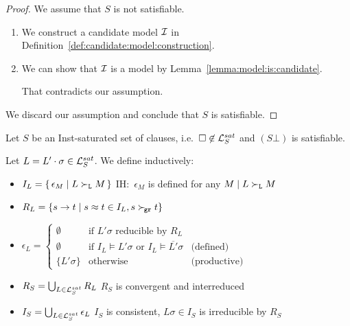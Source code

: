        \begin{proof} We assume that \( S \) is not satisfiable.
           \begin{enumerate}
               \item We construct a candidate model \( \mathcal{I} \) in Definition~\vref{def:candidate:model:construction}.
               \item We can show that \( \mathcal{I} \) is a model by Lemma~\vref{lemma:model:is:candidate}.

                That contradicts our assumption.
           \end{enumerate}
            We discard our assumption and conclude that \( S \) is satisfiable.
           \end{proof}

   \begin{definition}\label{def:candidate:model:construction}

        Let \( S \) be an Inst-saturated set of clauses,
        i.e.~\( \square\not\in\mathcal{L}_S^{sat} \) and \( (S\bot) \) is satisfiable.

        Let \( L = L'\cdot\sigma \in\mathcal{L}_S^{sat} \).
        We define inductively:

           \begin{itemize}
               \item \( I_L = \{ \, \epsilon_M\mid L\mathrel\succ_{\mathtt{L}} M \, \} \)
               \hfill  IH:~\( \epsilon_M \) is defined for any \( M\mid L\mathrel\succ_{\mathtt{L}} M \)

               \item \( R_L = \{ s \to t \mid s\approx t\in I_L, s\mathrel\succ_{\!\mathtt{gr}} t \} \)

                   \item \( \epsilon_L = \left \{
                       \begin{array}{cll}
                           \emptyset &\text{if }
                            L'\sigma\text{ reducible by }R_L
                           \\
                           \emptyset &\text{if }
                            I_L\vDash L'\sigma
                           \text{ or }
                            I_L\vDash \overline{L'}\sigma
                            &\text{(defined)}
                           \\
                           \{ L'\sigma \}
                            &\text{otherwise}
                            &\text{(productive)}
                       \end{array}
                   \right. \)

               \item
               \( R_S = \bigcup_{L\in\mathcal{L}_S^{sat}} R_L \)
               \hfill
               \( R_S \) is convergent and interreduced

               \item
               \( I_S = \bigcup_{L\in\mathcal{L}_S^{sat}} \epsilon_L \)
               \hfill
               \( I_S \) is consistent,
               \( L\sigma\in I_S \) is irreducible by \( R_S \)
           \end{itemize}
       \end{definition}

